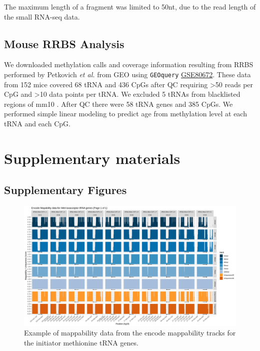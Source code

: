 \documentclass[]{book}
\begin{document}
The maximum length of a fragment was limited to 50nt, due to the read length of the small RNA-seq data.

\hypertarget{mousemethods}{%
\subsection{Mouse RRBS Analysis}\label{mousemethods}}

We downloaded methylation calls and coverage information resulting from RRBS performed by Petkovich \emph{et al.} \citep{Petkovich2017} from GEO using \texttt{GEOquery} \citep{Davis2007p} \href{https://www.ncbi.nlm.nih.gov/geo/query/acc.cgi?acc=GSE80672}{GSE80672}.
These data from 152 mice covered 68 tRNA and 436 CpGs after QC requiring \textgreater50 reads per CpG and \textgreater10 data points per tRNA.
We excluded 5 tRNAs from blacklisted regions of mm10 \citep{Amemiya2019}.
After QC there were 58 tRNA genes and 385 CpGs.
We performed simple linear modeling to predict age from methylation level at each tRNA and each CpG.

\newpage

\hypertarget{supplementary-materials}{%
\section*{Supplementary materials}\label{supplementary-materials}}

\hypertarget{supplementary-figures}{%
\subsection{Supplementary Figures}\label{supplementary-figures}}

\begin{figure}

{\centering \includegraphics[width=1\linewidth]{./figs/mappability-iMet1} 

}

\caption{Example of mappability data from the encode mappability tracks \citep{Derrien2012} for the initiator methionine tRNA genes.}\label{fig:mappabilityiMet1}
\end{figure}
\end{document}

